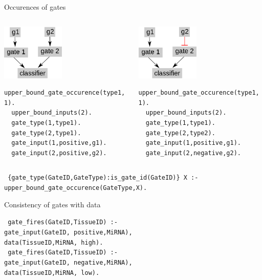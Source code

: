 \documentclass[10pt,dvipsnames]{beamer}
\begin{document}
\begin{frame}[fragile]{Occurences of gates}
 \begin{columns}  
 \begin{column}{0.6\textwidth}
 \begin{center}\includegraphics[width=3cm]{constraints_05.png}\end{center}
 \color{my_example_color}
  \begin{Verbatim}[fontsize=\small]
  upper_bound_gate_occurence(type1, 1).
  upper_bound_inputs(2).
  gate_type(1,type1).
  gate_type(2,type1).
  gate_input(1,positive,g1).
  gate_input(2,positive,g2).
 \end{Verbatim}
 \end{column}
 \begin{column}{0.6\textwidth}
 \begin{center}\includegraphics[width=3cm]{constraints_06.png}\end{center}
 \color{my_example_color}
  \begin{Verbatim}[fontsize=\small]
  upper_bound_gate_occurence(type1, 1).
  upper_bound_inputs(2).
  gate_type(1,type1).
  gate_type(2,type2).
  gate_input(1,positive,g1).
  gate_input(2,negative,g2).
 \end{Verbatim}
 \end{column}
 \end{columns}
 \vspace{1cm}
 \texttt{
  \{gate\_type(GateID,GateType):{\color{gray}\;is\_gate\_id(GateID)}\} X :-\\
     \quad upper\_bound\_gate\_occurence(GateType,X).
 }
\end{frame}
 

\begin{frame}[fragile]{Consistency of gates with data}

 \texttt{
 gate\_fires(GateID,TissueID) :-\\
   \quad gate\_input(GateID,{\color{red} positive},MiRNA),\\
   \quad data(TissueID,MiRNA,{\color{red} high}).\\
 }
 \vspace{1cm}
 \texttt{
 gate\_fires(GateID,TissueID) :-\\
   \quad gate\_input(GateID,{\color{red} negative},MiRNA),\\
   \quad data(TissueID,MiRNA,{\color{red} low}).
 }
\end{frame}
\end{document}
